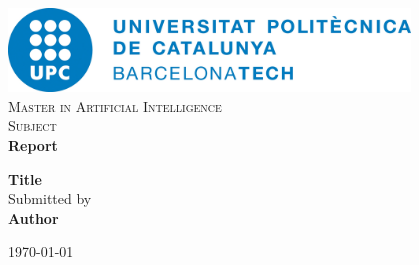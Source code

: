 \begin{titlepage}

\begin{center}


\includegraphics[width=0.8\textwidth]{img/title/upc}\\[0.1in]
\normalsize
\vspace{1cm}
\textsc{Master in Artificial Intelligence}\\

\vspace{4cm}
\textsc{Subject} \\
\normalsize \textbf{Report}
\vspace{2cm}

\Large \textbf {Title} \\

\vspace{2.5cm}
\normalsize Submitted by \\
\textbf{Author} \\ %



\vfill


{\normalsize \today}\\[1cm]
\end{center}

\end{titlepage}